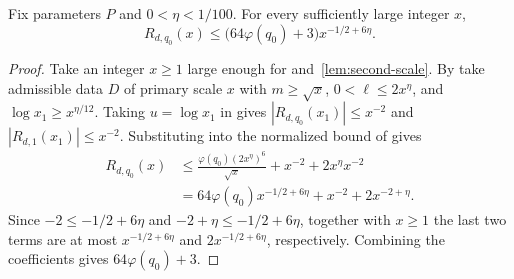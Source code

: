 \begin{lemma}
\label{lem:integer-bound}
\emitthmsource
Fix parameters $P$ and $0<\eta<1/100$. For every sufficiently large integer $x$,
\[
 R_{d,q_0}(x)\le \bigl(64\varphi(q_0)+3\bigr)x^{-1/2+6\eta}.
\]
\end{lemma}
\begin{proof}
Take an integer $x\ge1$ large enough for  and~\ref{lem:second-scale}. By  take admissible data $D$ of primary scale $x$ with $m\ge\sqrt{x}$, $0<\ell\le2x^\eta$, and $\log x_1\ge x^{\eta/12}$. Taking $u=\log x_1$ in  gives $|R_{d,q_0}(x_1)|\le x^{-2}$ and $|R_{d,1}(x_1)|\le x^{-2}$. Substituting into the normalized bound of  gives
\[
 \begin{aligned}
 R_{d,q_0}(x)
 &\le \frac{\varphi(q_0)(2x^\eta)^6}{\sqrt{x}}
       +x^{-2}+2x^\eta x^{-2}\\
 &=64\varphi(q_0)x^{-1/2+6\eta}+x^{-2}+2x^{-2+\eta}.
 \end{aligned}
\]
Since $-2\le -1/2+6\eta$ and $-2+\eta\le -1/2+6\eta$, together with $x\ge1$ the last two terms are at most $x^{-1/2+6\eta}$ and $2x^{-1/2+6\eta}$, respectively. Combining the coefficients gives $64\varphi(q_0)+3$.
\end{proof}


